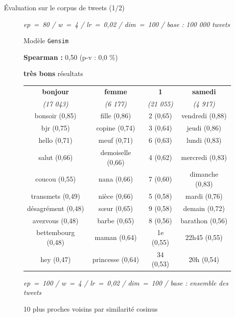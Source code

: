 \documentclass[10pt,xcolor=table,color={dvipsnames,usenames},ignorenonframetext,usepdftitle=false,french]{beamer}
\begin{document}
\begin{frame}{Évaluation sur le corpus de tweets (1/2)}
\begin{figure}
\begin{minipage}{.6\textwidth}
\begin{table}[!h]
\begin{center}
\end{center}
\emph{ep = 80 / w = 4 / lr = 0,02 / dim = 100 / base : 100 000 tweets}

\end{table}
\normalsize


\end{minipage}
\end{figure}

\pause 

\begin{figure}
\begin{minipage}{.4\textwidth}

Modèle \texttt{Gensim}

\medskip

\footnotesize
\textbf{ Spearman : } 0,50 (p-v : 0,0 \%)
\normalsize

\medskip

\faArrowCircleRight{} \textbf{très bons} résultats

\end{minipage}%
\begin{minipage}{.6\textwidth}
\tiny

\begin{table}[h]
\begin{center}
\begin{tabular}{|c|c|c|c|}
    \hline
\textbf{bonjour} & \textbf{femme} & \textbf{1} & \textbf{samedi} \tabularnewline
\emph{(17 043)} & \emph{(6 177)} & \emph{(21 055)} & \emph{(4 917)} \tabularnewline
       \hline
bonsoir (0,85) & fille (0,86) & 2 (0,65) & vendredi (0,88) \tabularnewline
bjr (0,75) & copine (0,74) & 3 (0,64) & jeudi (0,86) \tabularnewline
hello (0,71) & meuf (0,71) & 6 (0,63) & lundi (0,83) \tabularnewline
salut (0,66) & demoiselle (0,66) & 4 (0,62) & mercredi (0,83) \tabularnewline
coucou (0,55) & nana (0,66) & 7 (0,60) & dimanche (0,83) \tabularnewline
transmets (0,49) & nièce (0,66) & 5 (0,58) & mardi (0,76) \tabularnewline
désagrément (0,48) & sœur (0,65) & 9 (0,58) & demain (0,72) \tabularnewline
avezvous (0,48) & barbe (0,65) & 8 (0,56) & barathon (0,56) \tabularnewline
bettembourg (0,48) & maman (0,64) & 1e (0,55) & 22h45 (0,55) \tabularnewline
hey (0,47) & princesse (0,64) & 34 (0,53) & 20h (0,54) \tabularnewline
    \hline
 \end{tabular}
\captionsetup{margin=0cm,format=hang,justification=justified}
\end{center}
\emph{ep = 100 / w = 4 / lr = 0,02 / dim = 100 / base : ensemble des tweets}

\medskip

\footnotesize{10 plus proches voisins par similarité cosinus}
\end{table}

\normalsize

\end{minipage}
\end{figure}

\end{frame}
\end{document}
